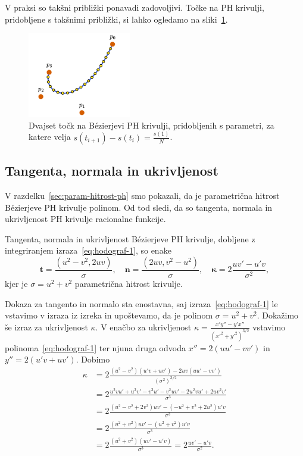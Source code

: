 \documentclass[isrm2, tisk]{fmfdelo}
\begin{document}
    V praksi so takšni približki ponavadi zadovoljivi.
    Točke na PH krivulji, pridobljene s takšnimi približki, si lahko ogledamo na sliki~\ref{fig:enakomerni-s}.
    \begin{figure}[h]
        \centering
        \includegraphics[width = 0.40\textwidth]{images/enakomerni-s}
        \caption{Dvajset točk na Bézierjevi PH krivulji, pridobljenih s parametri, za katere velja $s(t_{i+1})-s(t_i)= \frac{s(1)}{N}$.}
        \label{fig:enakomerni-s}
    \end{figure}

    \subsection{Tangenta, normala in ukrivljenost}
    V razdelku~\ref{sec:param-hitrost-ph} smo pokazali, da je parametrična hitrost Bézierjeve PH krivulje polinom.
    Od tod sledi, da so tangenta, normala in ukrivljenost PH krivulje racionalne funkcije.
    \begin{izrek}
        Tangenta, normala in ukrivljenost Bézierjeve PH krivulje, dobljene z integriranjem izraza~\eqref{eq:hodograf-1}, so enake
        \[\mathbf{t}=\frac{(u^2-v^2,2uv)}{\sigma}, \quad \mathbf{n}=\frac{(2uv,v^2-u^2)}{\sigma},\quad \mathbf{\kappa}=2\frac{uv'-u'v}{\sigma^2},\]
        kjer je $\sigma = u^2+v^2$ parametrična hitrost krivulje.
    \end{izrek}
    \begin{dokaz}
        Dokaza za tangento in normalo sta enostavna, saj izraza~\eqref{eq:hodograf-1} le vstavimo v izraza iz izreka in upoštevamo, da je polinom $\sigma = u^2+v^2$.
        Dokažimo še izraz za ukrivljenost $\kappa$.
        V enačbo za ukrivljenost  $\kappa = \frac{x'y''-y'x''}{(x'^2+y'^2)^{3/2}}$ vstavimo polinoma~\eqref{eq:hodograf-1} ter njuna druga odvoda $x'' = 2(uu'-vv')$ in $y'' = 2(u'v+uv')$.
        Dobimo
        \begin{align*}
            \kappa &= 2\frac{(u^2-v^2)(u'v+uv') - 2uv(uu'-vv')}{(\sigma^2)^{3/2}}\\
            &= 2\frac{u^2vu' + u^3v' - v^3u' - v^2uv' - 2u^2vu'+2uv^2v'}{\sigma^{3}} \\
            &= 2\frac{(u^2-v^2+2v^2)uv' - (-u^2+v^2+2u^2)u'v}{\sigma^{3}} \\
            &= 2\frac{(u^2+v^2)uv' - (u^2+v^2)u'v}{\sigma^{3}} \\
            &= 2\frac{(u^2+v^2)(uv' - u'v)}{\sigma^{3}} = 2\frac{uv' - u'v}{\sigma^{2}}.
        \end{align*}
    \end{dokaz}
\end{document}
